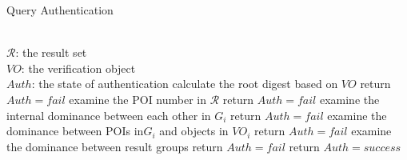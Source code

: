 \documentclass[10pt, conference, compsocconf]{IEEEtran}
\begin{document}
\begin{algorithm}[H]\scriptsize
	\caption{Query Authentication}
	\label{Algorithm2}
	\begin{algorithmic}[1]
		\REQUIRE~~\\
		$\mathcal{R}$: the result set\\
		$VO$: the verification object
		\ENSURE~~\\
		$Auth$: the state of authentication
		    \STATE calculate the root digest based on $VO$
		        \STATE return $Auth = fail$
		    \ENDIF
		    \STATE examine the POI number in $\mathcal{R}$
		        \STATE return $Auth = fail$
		    \ENDIF
		        \STATE examine the internal dominance between each other in $G_i$
		            \STATE return $Auth = fail$
		        \ENDIF
		        \STATE examine the dominance between POIs in$G_i$ and objects in $VO_i$
		            \STATE return $Auth = fail$
		        \ENDIF
		        \STATE examine the dominance between result groups
		            \STATE return $Auth = fail$
		        \ENDIF
		    \ENDFOR
		    \STATE return $Auth = success$
		\ENDFOR
	\end{algorithmic}
\end{algorithm}
\end{document}
